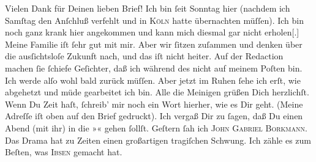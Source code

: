 \begin{ledgroupsized}[t]{13cm}
           Vielen Dank für Deinen lieben Brief!\pend
           \pstart
           Ich bin ſeit Sonntag hier (nachdem ich Samſtag den Anſchluß verfehlt und in \textsc{Köln} hatte übernachten müſſen). Ich bin noch ganz krank hier angekommen und kann
               mich diesmal gar nicht erholen{[}.{]} Meine Familie iſt ſehr gut mit
               mir. Aber wir ſitzen zuſammen und denken über die ausſichtsloſe Zukunft nach, und das
               iſt nicht heiter. Auf der Redaction machen ſie ſchiefe Geſichter, daß ich während des \label{K_L02809-1v}\label{K_L02809-1h} nicht auf meinem Poſten bin. Ich werde alſo wohl bald zurück {\pb}müſſen. Aber jetzt im Ruhen ſehe ich erſt, wie
               abgehetzt und müde gearbeitet ich bin.\pend
           \pstart
           Alle die Meinigen grüßen Dich herzlichſt.\pend
           \pstart
           Wenn Du Zeit haſt, ſchreib’ mir noch ein Wort hierher, wie es Dir geht. (Meine
               Adreſſe iſt oben auf den Brief gedruckt).\pend
           \pstart
           Ich vergaß Dir zu ſagen, daß Du einen Abend (mit ihr) in die »\label{K_L02809-2v}\label{K_L02809-2h}« gehen ſollſt.\pend
           \pstart
           Geſtern ſah ich \textsc{John Gabriel Borkmann}.  Das Drama hat zu Zeiten einen
               großartigen tragiſchen Schwung. Ich zähle es zum Beſten, was \strikeout{\textcolor{gray}{×}\-\textcolor{gray}{×}\-\textcolor{gray}{×}}{ }\textsc{Ibsen} gemacht hat.\pend

\end{ledgroupsized}
